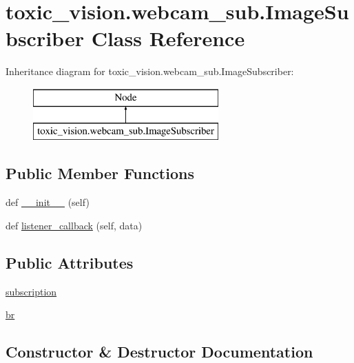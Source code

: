 \hypertarget{classtoxic__vision_1_1webcam__sub_1_1ImageSubscriber}{}\section{toxic\+\_\+vision.\+webcam\+\_\+sub.\+Image\+Subscriber Class Reference}
\label{classtoxic__vision_1_1webcam__sub_1_1ImageSubscriber}
Inheritance diagram for toxic\+\_\+vision.\+webcam\+\_\+sub.\+Image\+Subscriber\+:\begin{figure}[H]
\begin{center}
\leavevmode
\includegraphics[height=2.000000cm]{db/dd5/classtoxic__vision_1_1webcam__sub_1_1ImageSubscriber}
\end{center}
\end{figure}
\subsection*{Public Member Functions}
\begin{DoxyCompactItemize}
\item 
def \mbox{\hyperlink{classtoxic__vision_1_1webcam__sub_1_1ImageSubscriber_a8fb8c073ff5ad63af8124cbb1a7374d0}{\+\_\+\+\_\+init\+\_\+\+\_\+}} (self)
\item 
def \mbox{\hyperlink{classtoxic__vision_1_1webcam__sub_1_1ImageSubscriber_a8a4b1b1676ae3adb9a90315b9e82a0d3}{listener\+\_\+callback}} (self, data)
\end{DoxyCompactItemize}
\subsection*{Public Attributes}
\begin{DoxyCompactItemize}
\item 
\mbox{\hyperlink{classtoxic__vision_1_1webcam__sub_1_1ImageSubscriber_acafc58605e5f56862a1d83c4dfb5bf8a}{subscription}}
\item 
\mbox{\hyperlink{classtoxic__vision_1_1webcam__sub_1_1ImageSubscriber_a599b397d81ccc1969f159fe3563d272c}{br}}
\end{DoxyCompactItemize}


\subsection{Constructor \& Destructor Documentation}
\mbox{\label{classtoxic__vision_1_1webcam__sub_1_1ImageSubscriber_a8fb8c073ff5ad63af8124cbb1a7374d0}} 
